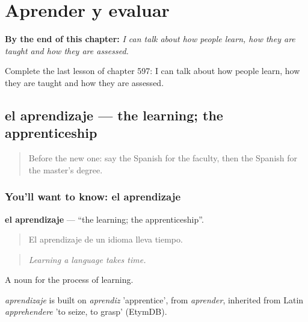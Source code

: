 
\chapter{Aprender y evaluar}
\label{ch:es-aprender-y-evaluar}

\begin{chapteropening}
\textbf{By the end of this chapter:} \emph{I can talk about how people learn, how they are taught and how they are assessed.}

Complete the last lesson of chapter 597: I can talk about how people learn, how they are taught and how they are assessed.
\end{chapteropening}

\section[el aprendizaje]{el aprendizaje — the learning; the apprenticeship}

\label{lesson:ES-C597-aprendizaje}



\begin{quote}
Before the new one: say the Spanish for the faculty, then the Spanish for the master's degree.
\end{quote}

\subsection*{You'll want to know: el aprendizaje}
\textbf{el aprendizaje} — \textquotedblleft{}the learning; the apprenticeship\textquotedblright{}.

\begin{quote}
El aprendizaje de un idioma lleva tiempo.
\end{quote}

\begin{quote}
\emph{Learning a language takes time.}
\end{quote}

A noun for the process of learning.

\begin{cousinweb}
\emph{aprendizaje} is built on \emph{aprendiz} 'apprentice', from \emph{aprender}, inherited from Latin \emph{apprehendere} 'to seize, to grasp' (EtymDB).
\end{cousinweb}

